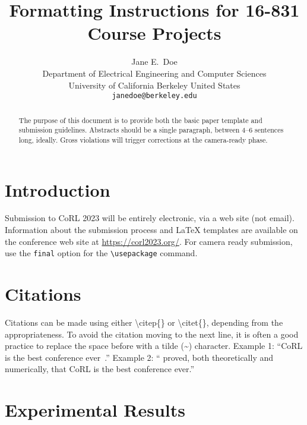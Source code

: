 \documentclass{article}
\title{Formatting Instructions for 16-831 Course Projects}
\author{
  Jane E.~Doe\\
  Department of Electrical Engineering and Computer Sciences\\
  University of California Berkeley 
  United States\\
  \texttt{janedoe@berkeley.edu} \\
}
\begin{document}
\maketitle


\begin{abstract}
    The purpose of this document is to provide both the basic paper template and submission guidelines. Abstracts should be a single paragraph, between 4--6 sentences long, ideally. Gross violations will trigger corrections at the camera-ready phase.
\end{abstract}



\section{Introduction}
	
    Submission to CoRL 2023 will be entirely electronic, via a web site (not email). Information about the submission process and \LaTeX{} templates are available on the conference web site at \url{https://corl2023.org/}. For camera ready submission, use the \texttt{final} option for the \texttt{\textbackslash usepackage} command. 


\section{Citations}
\label{sec:citations}

	Citations can be made using either \textbackslash citep\{\} or \textbackslash citet\{\}, depending from the appropriateness. To avoid the citation moving to the next line, it is often a good practice to replace the space before with a tilde (\~{}) character.
	Example 1: ``CoRL is the best conference ever~\citep{Gauss1857}.''
	Example 2: ``\citet{Lagrange1788} proved, both theoretically and numerically, that CoRL is the best conference ever.''
	

\section{Experimental Results}
\label{sec:result}
\end{document}
